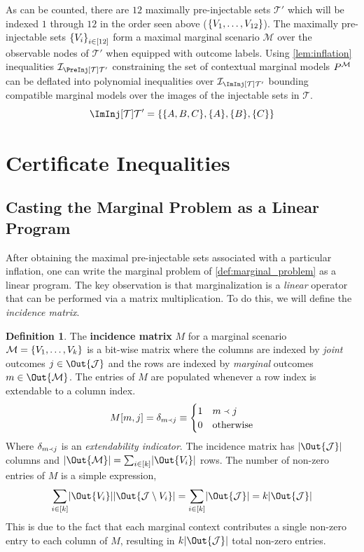 \documentclass[aps, 10pt, english, twoside, pra, nofootinbib, longbibliography]{revtex4-1}
\theoremstyle{plain}
\theoremstyle{definition}
\newtheorem{definition}[theorem]{Definition}
\theoremstyle{remark}
\newcommand{\ext}{\mathrel{\Yleft}}
\newcommand{\mscenario}{\mathcal{M}}
\newcommand{\jointvar}{\mathcal{J}}
\newcommand{\ts}{\mathcal{T}}
\newcommand{\term}[1]{\textcolor{Mahogany}{\textbf{#1}}}
\begin{document}
    As can be counted, there are $12$ maximally pre-injectable sets $\ts'$ which will be indexed $1$ through $12$ in the order seen above ($\bc{V_1, \ldots, V_{12}}$). The maximally pre-injectable sets $\bc{V_i}_{i \in \bs{12}}$ form a maximal marginal scenario $\mscenario$ over the observable nodes of $\ts'$ when equipped with outcome labels. Using \cref{lem:inflation} inequalities $\mathcal{I}_{\PreInj[\ts]{\ts'}}$ constraining the set of contextual marginal models $\prob^{\mscenario}$ can be deflated into polynomial inequalities over $\mathcal{I}_{\ImInj[\ts]{\ts'}}$ bounding compatible marginal models over the images of the injectable sets in $\ts$.
    \[ \ImInj[\ts]{\ts'} = \bc{\bc{A, B, C}, \bc{A}, \bc{B}, \bc{C}} \]

    \section{Certificate Inequalities}
    \label{sec:certificate_inequalities}
    \subsection{Casting the Marginal Problem as a Linear Program}
    After obtaining the maximal pre-injectable sets associated with a particular inflation, one can write the marginal problem of \cref{def:marginal_problem} as a linear program. The key observation is that marginalization is a \textit{linear} operator that can be performed via a matrix multiplication. To do this, we will define the \textit{incidence matrix}.
    \begin{definition}
        The \term{incidence matrix} $M$ for a marginal scenario $\mscenario = \bc{V_1, \dots, V_k}$ is a bit-wise matrix where the columns are indexed by \textit{joint} outcomes $j \in \Out{\jointvar}$ and the rows are indexed by \textit{marginal} outcomes $m \in \Out{\mscenario}$. The entries of $M$ are populated whenever a row index is extendable to a column index.
        \[ M\bs{m, j} = \de_{m \ext j} \defined \begin{cases}
            1 & m \ext j \\
            0 & \text{otherwise}
        \end{cases} \]
        Where $\de_{m \ext j}$ is an \textit{extendability indicator}. The incidence matrix has $\abs{\Out{\jointvar}}$ columns and $\abs{\Out{\mscenario}} = \sum_{i\in \bs{k}} \abs{\Out{V_i}}$ rows. The number of non-zero entries of $M$ is a simple expression,
        \[ \sum_{i\in\bs{k}} \abs{\Out{V_i}}\abs{\Out{\jointvar \setminus V_i}} = \sum_{i\in \bs{k}} \abs{\Out{\jointvar}} = k\abs{\Out{\jointvar}} \]
        This is due to the fact that each marginal context contributes a single non-zero entry to each column of $M$, resulting in $k\abs{\Out{\jointvar}}$ total non-zero entries.
    \end{definition}
\end{document}
